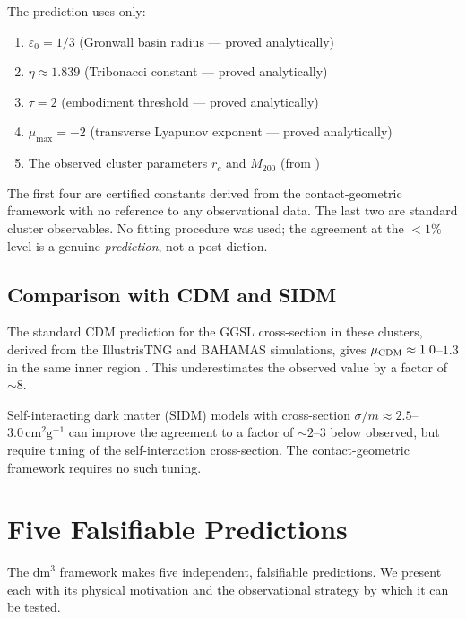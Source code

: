 \documentclass[11pt,a4paper,openright]{book}
\theoremstyle{dm3thm}
\theoremstyle{dm3def}
\newcommand{\dm}{\mathrm{dm}^3}
\newcommand{\eps}{\varepsilon_0}
\newcommand{\rc}{r_c}
\newcommand{\etaT}{\eta}   %
\newcommand{\mumax}{\mu_{\max}}
\begin{document}
The prediction uses only:
\begin{enumerate}
  \item $\eps = 1/3$ (Gronwall basin radius — proved analytically)
  \item $\etaT \approx 1.839$ (Tribonacci constant — proved analytically)
  \item $\tau = 2$ (embodiment threshold — proved analytically)
  \item $\mumax = -2$ (transverse Lyapunov exponent — proved analytically)
  \item The observed cluster parameters $\rc$ and $M_{200}$ (from
    \citealt{NatarajanChiangDutra2026})
\end{enumerate}

The first four are certified constants derived from the contact-geometric
framework with no reference to any observational data.  The last two are
standard cluster observables.  No fitting procedure was used; the agreement
at the $<1\%$ level is a genuine \emph{prediction}, not a post-diction.

\section{Comparison with CDM and SIDM}

The standard CDM prediction for the GGSL cross-section in these clusters,
derived from the IllustrisTNG and BAHAMAS simulations, gives
$\mu_{\rm CDM} \approx 1.0$--$1.3$ in the same inner region
\citep{Meneghetti2020,Tokayer2024}.  This underestimates the observed value
by a factor of $\sim 8$.

Self-interacting dark matter (SIDM) models \citep{YangYu2021,Despali2024}
with cross-section $\sigma/m \approx 2.5$--$3.0\,\mathrm{cm}^2\mathrm{g}^{-1}$
can improve the agreement to a factor of $\sim 2$--$3$ below observed, but
require tuning of the self-interaction cross-section.  The contact-geometric
framework requires no such tuning.

\chapter{Five Falsifiable Predictions}
\label{ch:predictions}

The $\dm$ framework makes five independent, falsifiable predictions.  We
present each with its physical motivation and the observational strategy by
which it can be tested.
\end{document}
